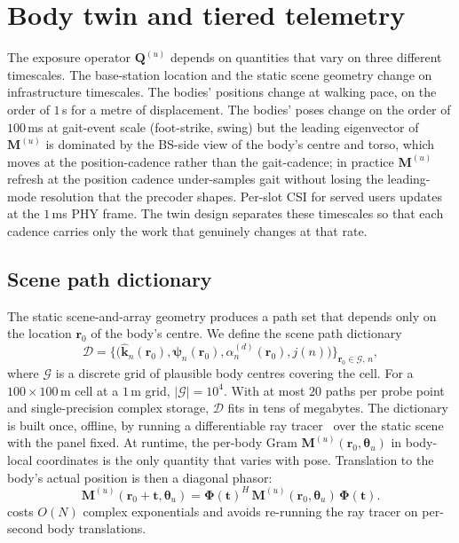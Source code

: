 \documentclass[journal,twocolumn,10pt]{IEEEtran}
\theoremstyle{plain}
\theoremstyle{remark}
\newcommand{\khat}{\hat{\bm{k}}}
\newcommand{\rr}{\mathbf{r}}
\newcommand{\Qmat}{\mathbf{Q}}
\newcommand{\Mmat}{\mathbf{M}}
\newcommand{\Phimat}{\mathbf{\Phi}}
\newcommand{\psin}{\bm{\psi}_n}
\newcommand{\Dict}{\mathcal{D}}
\begin{document}
\section{Body twin and tiered telemetry}\label{sec:twin}

The exposure operator $\Qmat^{(u)}$ depends on quantities that vary
on three different timescales. The base-station location and the
static scene geometry change on infrastructure timescales. The
bodies' positions change at walking pace, on the order of $1\,$s
for a metre of displacement. The bodies' poses change on the order
of $100\,$ms at gait-event scale (foot-strike, swing) but the
leading eigenvector of $\Mmat^{(u)}$ is dominated by the BS-side
view of the body's centre and torso, which moves at the
position-cadence rather than the gait-cadence; in practice
$\Mmat^{(u)}$ refresh at the position cadence under-samples gait
without losing the leading-mode resolution that the precoder
shapes. Per-slot CSI for served users updates at the $1\,$ms PHY
frame. The twin design separates these timescales so that each
cadence carries only the work that genuinely changes at that rate.

\subsection{Scene path dictionary}\label{sec:dict}

The static scene-and-array geometry produces a path set that depends
only on the location $\rr_0$ of the body's centre. We define the
scene path dictionary
\begin{equation}\label{eq:dict-def}
  \Dict = \bigl\{\bigl(\khat_n(\rr_0), \psin(\rr_0),
  \alpha_n^{(d)}(\rr_0), j(n)\bigr)\bigr\}_{\rr_0 \in \mathcal{G},\,n},
\end{equation}
where $\mathcal{G}$ is a discrete grid of plausible body centres
covering the cell. For a $100 \times 100\,$m cell at a $1\,$m grid,
$|\mathcal{G}| = 10^4$. With at most $20$ paths per probe point and
single-precision complex storage, $\Dict$ fits in tens of megabytes.
The dictionary is built once, offline, by running a differentiable
ray tracer~\cite{SionnaRT,DiffeRT} over the static scene with the
panel fixed. At runtime, the per-body Gram
$\Mmat^{(u)}(\rr_0, \bm\theta_u)$ in body-local coordinates is the
only quantity that varies with pose. Translation to the body's actual
position is then a diagonal phasor:
\begin{equation}\label{eq:translation}
  \Mmat^{(u)}(\rr_0 + \mathbf{t}, \bm\theta_u) =
  \Phimat(\mathbf{t})^H\,\Mmat^{(u)}(\rr_0, \bm\theta_u)\,
  \Phimat(\mathbf{t}).
\end{equation}
 costs $O(N)$ complex exponentials and avoids
re-running the ray tracer on per-second body translations.
\end{document}
